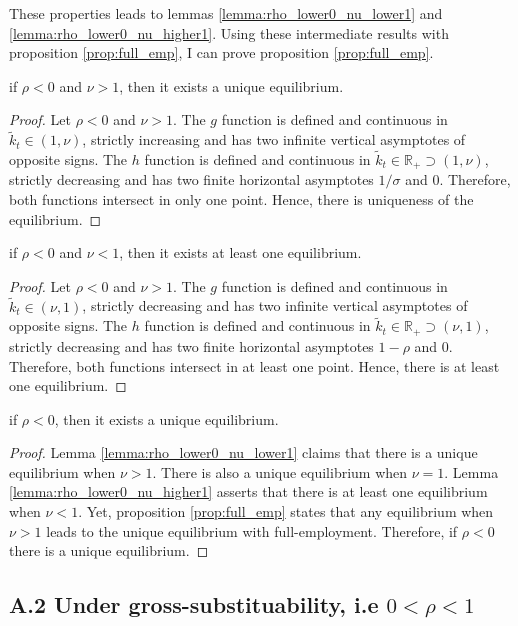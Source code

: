 These properties leads to lemmas \ref{lemma:rho_lower0_nu_lower1} and \ref{lemma:rho_lower0_nu_higher1}. Using these intermediate results with proposition \ref{prop:full_emp}, I can prove proposition \ref{prop:full_emp}.
	\begin{lemma}\label{lemma:rho_lower0_nu_lower1}
		if $\rho < 0$ and $\nu > 1$, then it exists a unique equilibrium.
	\end{lemma}
	\begin{proof}
		Let $\rho < 0$ and $\nu > 1$. The $g$ function is defined and continuous in $\tilde{k}_t \in \left(1, \nu \right)$, strictly increasing and has two infinite vertical asymptotes of opposite signs. The $h$ function is defined and continuous in $\tilde{k}_t \in \mathbb{R}_+ \supset \left(1, \nu \right)$, strictly decreasing and has two finite horizontal asymptotes $1/\sigma$ and $0$. Therefore, both functions intersect in only one point. Hence, there is uniqueness of the equilibrium.
	\end{proof}
	\begin{lemma}\label{lemma:rho_lower0_nu_higher1}
		if $\rho < 0$ and $\nu < 1$, then it exists at least one equilibrium.
	\end{lemma}
	\begin{proof}
		Let $\rho < 0$ and $\nu > 1$. The $g$ function is defined and continuous in $\tilde{k}_t \in \left(\nu, 1\right)$, strictly decreasing and has two infinite vertical asymptotes of opposite signs. The $h$ function is defined and continuous in $\tilde{k}_t \in \mathbb{R}_+ \supset \left(\nu, 1\right)$, strictly decreasing and has two finite horizontal asymptotes $1-\rho$ and $0$. Therefore, both functions intersect in at least one point. Hence, there is at least one equilibrium.
	\end{proof}
	\begin{proposition}
		if $\rho < 0$, then it exists a unique equilibrium.
	\end{proposition}
	\begin{proof}
		Lemma \ref{lemma:rho_lower0_nu_lower1} claims that there is a unique equilibrium when $\nu > 1$. There is also a unique equilibrium when $\nu = 1$. Lemma \ref{lemma:rho_lower0_nu_higher1} asserts that there is at least one equilibrium when $\nu < 1$. Yet, proposition \ref{prop:full_emp} states that any equilibrium when $\nu > 1$ leads to the unique equilibrium with full-employment. Therefore, if $\rho < 0$ there is a unique equilibrium.
	\end{proof}

\subsection*{A.2 Under gross-substituability, i.e $0 < \rho < 1$}


